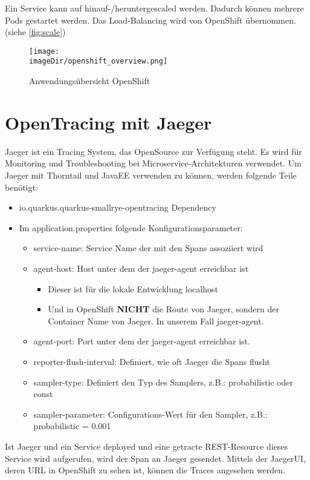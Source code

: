 \documentclass[11pt, a4paper]{article}   	%
\newcommand{\imageDir}{images}
\begin{document}
Ein Service kann auf hinauf-/heruntergescaled werden. Dadurch können mehrere Pods gestartet werden. Das Load-Balancing wird von OpenShift übernommen. (siehe \ref{fig:scale})

\begin{figure}[H]
	\centering
	\texttt{[image: \\imageDir/openshift\_overview.png]}
	\caption{Anwendungsübersicht OpenShift}
	\label{fig:OpenShift}
\end{figure}

\section{OpenTracing mit Jaeger}
Jaeger ist ein Tracing System, das OpenSource zur Verfügung steht. Es wird für Monitoring und Troubleshooting bei Microservice-Architekturen verwendet.
Um Jaeger mit Thorntail und JavaEE verwenden zu können, werden folgende Teile benötigt:
\begin{itemize}
	\item io.quarkus.quarkus-smallrye-opentracing  Dependency
	\item Im application.properties folgende Konfigurationsparameter:
	\begin{itemize}
		\item service-name: Service Name der mit den Spans assoziiert wird
		\item agent-host: Host unter dem der jaeger-agent erreichbar ist
		\begin{itemize}
			\item Dieser ist für die lokale Entwicklung localhost
			\item Und in OpenShift \textbf{NICHT} die Route von Jaeger, sondern der Container Name von Jaeger. In unserem Fall jaeger-agent.
		\end{itemize}
		\item agent-port: Port unter dem der jaeger-agent erreichbar ist.
		\item reporter-flush-interval: Definiert, wie oft Jaeger die Spans flusht
		\item sampler-type: Definiert den Typ des Samplers, z.B.: probabilistic oder const
		\item sampler-parameter: Configurations-Wert für den Sampler, z.B.: probabilistic = 0.001
	\end{itemize}
\end{itemize} 

Ist Jaeger und ein Service deployed und eine getracte REST-Resource dieses Service wird aufgerufen, wird der Span an Jaeger gesendet. Mittels der JaegerUI, deren URL in OpenShift zu sehen ist, können die Traces angesehen werden.
\end{document}
